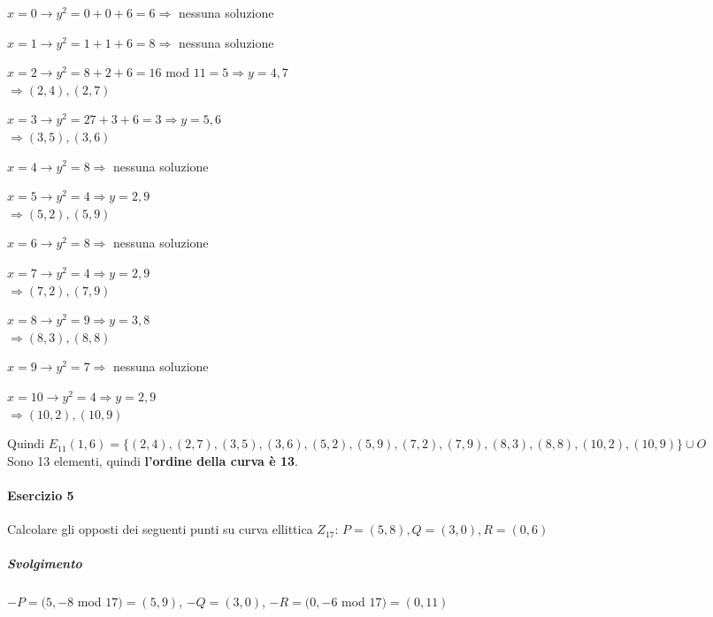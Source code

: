 \documentclass[10pt]{book}
\begin{document}
\begin{multicols}{2}
\begin{list}{}{}
	\item $x=0\longrightarrow y^2 = 0+0+6 = 6 \Rightarrow$ nessuna soluzione
	\item $x=1\longrightarrow y^2 = 1 + 1 + 6 = 8\Rightarrow$ nessuna soluzione
	\item $x=2\longrightarrow y^2 = 8+2+6 = 16$ mod $11 = 5\Rightarrow y=4,7$\\
	$\Longrightarrow (2,4),(2,7)$
	\item $x=3\longrightarrow y^2 = 27+3+6 = 3\Rightarrow y=5,6$\\$\Longrightarrow (3,5),(3,6)$
	\item $x=4\longrightarrow y^2 = 8\Rightarrow$ nessuna soluzione
	\item $x=5\longrightarrow y^2 = 4\Rightarrow y=2,9$\\$\Longrightarrow (5,2),(5,9)$
	\item $x=6\longrightarrow y^2 = 8\Rightarrow$ nessuna soluzione
	\item $x=7\longrightarrow y^2 = 4\Rightarrow y=2,9$\\$\Longrightarrow (7,2),(7,9)$
	\item $x=8\longrightarrow y^2 = 9\Rightarrow y=3,8$\\$\Longrightarrow (8,3),(8,8)$
	\item $x=9\longrightarrow y^2 = 7\Rightarrow$ nessuna soluzione
	\item $x=10\longrightarrow y^2 = 4\Rightarrow y=2,9$\\$\Longrightarrow (10,2),(10,9)$
\end{list}
\end{multicols}
Quindi $E_{11}(1,6)=\{(2,4),(2,7),(3,5),(3,6),(5,2),(5,9),(7,2),(7,9),(8,3),(8,8),(10,2),(10,9)\}\cup O$\\
Sono 13 elementi, quindi \textbf{l'ordine della curva è 13}.

\paragraph{Esercizio 5} Calcolare gli opposti dei seguenti punti su curva ellittica $Z_{17}$: $P=(5,8), Q=(3,0), R=(0,6)$
\subparagraph{Svolgimento} $-P=(5, -8$ mod $17) = (5,9)$, $-Q = (3,0)$, $-R=(0, -6$ mod $17) = (0, 11)$
\end{document}
